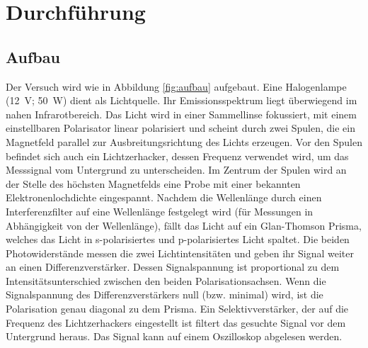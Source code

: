 






\section{Durchführung \cite{man}}
\subsection{Aufbau}
Der Versuch wird wie in Abbildung \ref{fig:aufbau} aufgebaut. Eine Halogenlampe
(\qty{12}{\V}; \qty{50}{\W}) dient als Lichtquelle. Ihr Emissionsspektrum liegt %
überwiegend im nahen Infrarotbereich. Das Licht wird in einer Sammellinse
fokussiert, mit einem einstellbaren Polarisator linear polarisiert und scheint
durch zwei Spulen, die ein Magnetfeld parallel zur Ausbreitungsrichtung des 
Lichts erzeugen. Vor den Spulen befindet sich auch ein Lichtzerhacker, dessen 
Frequenz verwendet wird, um das Messsignal vom Untergrund zu unterscheiden. Im 
Zentrum der Spulen wird an der Stelle des höchsten Magnetfelds eine Probe mit
einer bekannten Elektronenlochdichte eingespannt. Nachdem die Wellenlänge durch
einen Interferenzfilter auf eine Wellenlänge festgelegt wird (für Messungen in
Abhängigkeit von der Wellenlänge), fällt das Licht auf ein Glan-Thomson Prisma,
welches das Licht in s-polarisiertes und p-polarisiertes Licht spaltet. Die
beiden Photowiderstände messen die zwei Lichtintensitäten und geben ihr Signal
weiter an einen Differenzverstärker. Dessen Signalspannung ist proportional zu
dem Intensitätsunterschied zwischen den beiden Polarisationsachsen. Wenn die
Signalspannung des Differenzverstärkers null (bzw. minimal) wird, ist die
Polarisation genau diagonal zu dem Prisma. Ein Selektivverstärker, der auf die
Frequenz des Lichtzerhackers eingestellt ist filtert das gesuchte Signal vor dem
Untergrund heraus. Das Signal kann auf einem Oszilloskop abgelesen werden.


